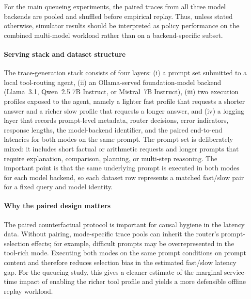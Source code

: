 \documentclass[preprint,12pt]{elsarticle}
\begin{document}
For the main queueing experiments, the paired traces from all three model
backends are pooled and shuffled before empirical replay. Thus, unless stated
otherwise, simulator results should be interpreted as policy performance on
the combined multi-model workload rather than on a backend-specific subset.

\paragraph{Serving stack and dataset structure}
The trace-generation stack consists of four layers:
(i) a prompt set submitted to a local tool-routing agent,
(ii) an Ollama-served foundation-model backend
(Llama~3.1, Qwen~2.5 7B Instruct, or Mistral~7B Instruct),
(iii) two execution profiles exposed to the agent, namely a lighter fast profile that
requests a shorter answer and a richer slow profile that requests a longer answer, and
(iv) a logging layer that records prompt-level metadata, router decisions, error
indicators, response lengths, the model-backend identifier, and the paired end-to-end
latencies for both modes on the same prompt.
The prompt set is deliberately mixed: it includes short factual or arithmetic requests
and longer prompts that require explanation, comparison, planning, or multi-step
reasoning.
The important point is that the same underlying prompt is executed in both modes for
each model backend, so each dataset row represents a matched fast/slow pair for a fixed
query and model identity.

\paragraph{Why the paired design matters}
The paired counterfactual protocol is important for causal hygiene in the latency data. Without pairing, mode-specific trace pools can inherit the router's prompt-selection effects; for example, difficult prompts may be overrepresented in the tool-rich mode. Executing both modes on the same prompt conditions on prompt content and therefore reduces selection bias in the estimated fast/slow latency gap. For the queueing study, this gives a cleaner estimate of the marginal service-time impact of enabling the richer tool profile and yields a more defensible offline replay workload.
\end{document}
